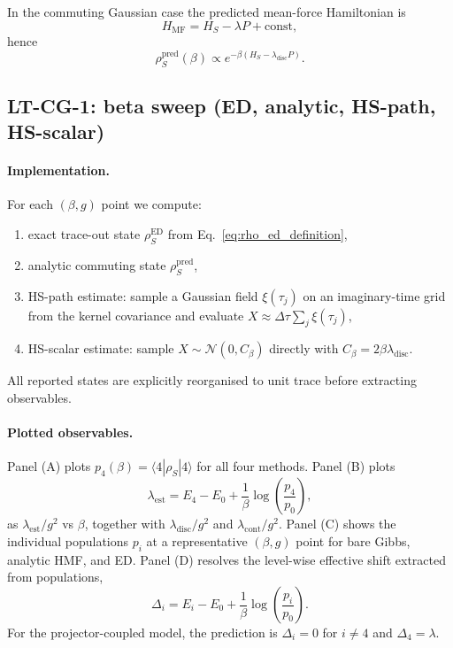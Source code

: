 In the commuting Gaussian case the predicted mean-force Hamiltonian is
\begin{equation}
H_{\mathrm{MF}}=H_S-\lambda P+\mathrm{const},
\label{eq:hmf_projector_form}
\end{equation}
hence
\begin{equation}
\rho_S^{\mathrm{pred}}(\beta)\propto e^{-\beta(H_S-\lambda_{\mathrm{disc}}P)}.
\end{equation}

\subsection{LT-CG-1: beta sweep (ED, analytic, HS-path, HS-scalar)}

\paragraph*{Implementation.}
For each $(\beta,g)$ point we compute:
\begin{enumerate}
\item exact trace-out state $\rho_S^{\mathrm{ED}}$ from Eq.~\eqref{eq:rho_ed_definition},
\item analytic commuting state $\rho_S^{\mathrm{pred}}$,
\item HS-path estimate: sample a Gaussian field $\xi(\tau_j)$ on an imaginary-time
grid from the kernel covariance and evaluate
$X\approx\Delta\tau\sum_j\xi(\tau_j)$,
\item HS-scalar estimate: sample $X\sim\mathcal N(0,C_\beta)$ directly with
$C_\beta=2\beta\lambda_{\mathrm{disc}}$.
\end{enumerate}
All reported states are explicitly reorganised to unit trace before extracting
observables.

\paragraph*{Plotted observables.}
Panel (A) plots $p_4(\beta)=\langle 4|\rho_S|4\rangle$ for all four methods.
Panel (B) plots
\begin{equation}
\lambda_{\mathrm{est}}
=
E_4-E_0+\frac{1}{\beta}\log\!\left(\frac{p_4}{p_0}\right),
\label{eq:lambda_est}
\end{equation}
as $\lambda_{\mathrm{est}}/g^2$ vs $\beta$, together with
$\lambda_{\mathrm{disc}}/g^2$ and $\lambda_{\mathrm{cont}}/g^2$.
Panel (C) shows the individual populations $p_i$ at a representative
$(\beta,g)$ point for bare Gibbs, analytic HMF, and ED.
Panel (D) resolves the level-wise effective shift extracted from populations,
\begin{equation}
\Delta_i
=
E_i-E_0+\frac{1}{\beta}\log\!\left(\frac{p_i}{p_0}\right).
\label{eq:delta_i_est}
\end{equation}
For the projector-coupled model, the prediction is $\Delta_i=0$ for $i\neq 4$
and $\Delta_4=\lambda$.

